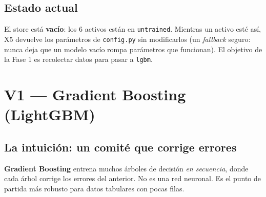 \documentclass[11pt,a4paper]{report}
\newcommand{\code}[1]{\texttt{\def\_{\textunderscore\allowbreak}#1}}
\begin{document}
\section{Estado actual}

El store está \textbf{vacío}: los 6 activos están en \code{untrained}. Mientras un activo esté
así, X5 devuelve los parámetros de \code{config.py} sin modificarlos (un \emph{fallback} seguro:
nunca deja que un modelo vacío rompa parámetros que funcionan). El objetivo de la Fase 1 es
recolectar datos para pasar a \code{lgbm}.

\chapter{V1 — Gradient Boosting (LightGBM)}

\section{La intuición: un comité que corrige errores}

\textbf{Gradient Boosting} entrena muchos árboles de decisión \emph{en secuencia}, donde cada
árbol corrige los errores del anterior. No es una red neuronal. Es el punto de partida más
robusto para datos tabulares con pocas filas.
\end{document}
